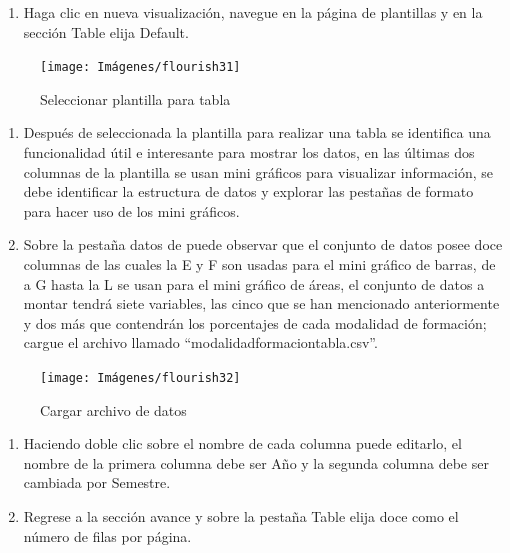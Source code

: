 \documentclass[
]{book}
\providecommand{\tightlist}{%
  \setlength{\itemsep}{0pt}\setlength{\parskip}{0pt}}
\begin{document}
\begin{enumerate}
\def\labelenumi{\arabic{enumi}.}
\tightlist
\item
  Haga clic en nueva visualización, navegue en la página de plantillas y en la sección Table elija
  Default.
\end{enumerate}

\begin{figure}

{\centering \texttt{[image: Imágenes/flourish31]} 

}

\caption{Seleccionar plantilla para tabla}\label{fig:paso1tablatextoflourish-fig}
\end{figure}

\begin{enumerate}
\def\labelenumi{\arabic{enumi}.}
\setcounter{enumi}{1}
\item
  Después de seleccionada la plantilla para realizar una tabla se identifica una funcionalidad útil e interesante para mostrar los datos, en las últimas dos columnas de la plantilla se usan mini gráficos para visualizar información, se debe identificar la estructura de datos y explorar las pestañas de formato para hacer uso de los mini gráficos.
\item
  Sobre la pestaña datos de puede observar que el conjunto de datos posee doce columnas de las cuales la E y F son usadas para el mini gráfico de barras, de a G hasta la L se usan para el mini gráfico de áreas, el conjunto de datos a montar tendrá siete variables, las cinco que se han mencionado anteriormente y dos más que contendrán los porcentajes de cada modalidad de formación; cargue el archivo llamado ``modalidadformaciontabla.csv''.
\end{enumerate}

\begin{figure}

{\centering \texttt{[image: Imágenes/flourish32]} 

}

\caption{Cargar archivo de datos}\label{fig:paso3tablatextoflourish-fig}
\end{figure}

\begin{enumerate}
\def\labelenumi{\arabic{enumi}.}
\setcounter{enumi}{3}
\item
  Haciendo doble clic sobre el nombre de cada columna puede editarlo, el nombre de la primera columna debe ser Año y la segunda columna debe ser cambiada por Semestre.
\item
  Regrese a la sección avance y sobre la pestaña Table elija doce como el número de filas por página.
\end{enumerate}
\end{document}
